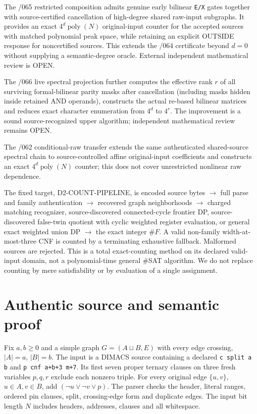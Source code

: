 \documentclass[11pt]{article}
\begin{document}
The /065 restricted composition admits genuine early bilinear \texttt{E/X} gates
together with source-certified cancellation of high-degree shared raw-input
subgraphs. It provides an exact $4^d\operatorname{poly}(N)$ original-input
counter for the accepted sources with matched polynomial peak space,
while retaining an explicit OUTSIDE response for noncertified sources.
This extends the /064 certificate beyond $d=0$ without supplying a
semantic-degree oracle. External independent mathematical review is OPEN.

The /066 live spectral projection further computes the effective rank $r$ of all surviving formal-bilinear parity masks after cancellation (including masks hidden inside retained AND operands), constructs the actual re-based bilinear matrices and reduces exact character enumeration from $4^d$ to $4^r$. The improvement is a sound source-recognized upper algorithm; independent mathematical review remains OPEN.

The /062 conditional-raw transfer extends the same authenticated shared-source spectral chain to source-controlled affine original-input coefficients and constructs an exact $4^d\operatorname{poly}(N)$ counter; this does not cover unrestricted nonlinear raw dependence.

The fixed target, D2-COUNT-PIPELINE, is encoded source bytes $\to$ full parse and family authentication $\to$ recovered graph neighborhoods $\to$ charged matching recognizer, source-discovered connected-cycle frontier DP, source-discovered false-twin quotient with cyclic weighted register evaluation, or general exact weighted union DP $\to$ the exact integer $\#F$. A valid non-family width-at-most-three CNF is counted by a terminating exhaustive fallback. Malformed sources are rejected. This is a total exact-counting method on its declared valid-input domain, not a polynomial-time general \#SAT algorithm. We do not replace counting by mere satisfiability or by evaluation of a single assignment.

\section{Authentic source and semantic proof}
Fix $a,b\geq 0$ and a simple graph $G=(A\sqcup B,E)$ with every edge crossing, $|A|=a$, $|B|=b$. The input is a DIMACS source containing a declared \texttt{c split a b} and \texttt{p cnf a+b+3 m+7}. Its first seven proper ternary clauses on three fresh variables $p,q,r$ exclude each nonzero triple. For every original edge $\{u,v\}$, $u\in A,v\in B$, add $(\neg u\lor\neg v\lor p)$. The parser checks the header, literal ranges, ordered pin clauses, split, crossing-edge form and duplicate edges. The input bit length $N$ includes headers, addresses, clauses and all whitespace.
\end{document}
